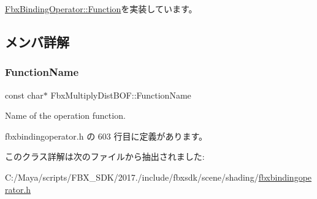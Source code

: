 \hyperlink{class_fbx_binding_operator_1_1_function_a9bbeec993a6e453a6569e7f40a85fd52}{Fbx\+Binding\+Operator\+::\+Function}を実装しています。



\subsection{メンバ詳解}
\mbox{\label{class_fbx_multiply_dist_b_o_f_a94b148cde29c7d50de35d8da207ecf6a}} 
\subsubsection{\texorpdfstring{Function\+Name}{FunctionName}}
{\footnotesize\ttfamily const char$\ast$ Fbx\+Multiply\+Dist\+B\+O\+F\+::\+Function\+Name\hspace{0.3cm}{\ttfamily [static]}}



Name of the operation function. 



 fbxbindingoperator.\+h の 603 行目に定義があります。



このクラス詳解は次のファイルから抽出されました\+:\begin{DoxyCompactItemize}
\item 
C\+:/\+Maya/scripts/\+F\+B\+X\+\_\+\+S\+D\+K/2017./include/fbxsdk/scene/shading/\hyperlink{fbxbindingoperator_8h}{fbxbindingoperator.\+h}\end{DoxyCompactItemize}
